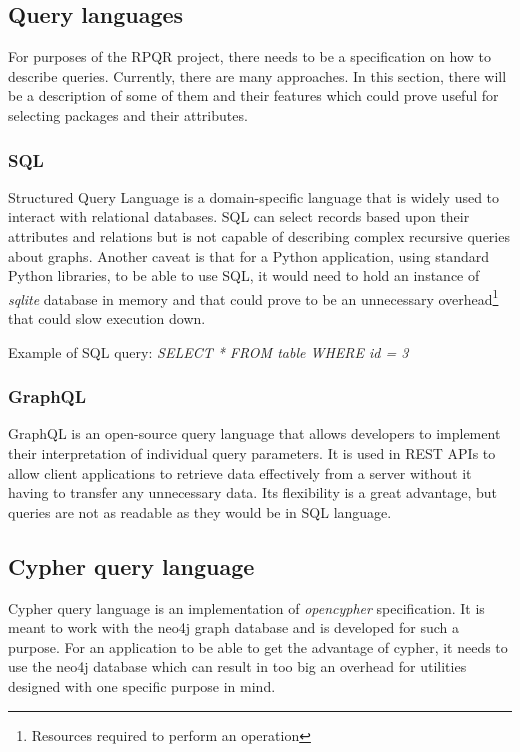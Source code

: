 \subsection*{Query languages}
For purposes of the RPQR project, there needs to be a specification on how to describe queries. Currently,
there are many approaches. In this section, there will be a description of some of them and their features
which could prove useful for selecting packages and their attributes.

\subsubsection*{SQL}
Structured Query Language\cite{SQL} is a domain-specific language that is widely used to interact with
relational databases. SQL can select records based upon their attributes and relations but
is not capable of describing complex recursive queries about graphs. Another caveat is that for a Python
application, using standard Python libraries, to be able to use SQL, it would need to hold an instance of \textit{sqlite} database in memory and
that could prove to be an unnecessary overhead\footnote{Resources required to perform an operation} that could slow execution down.

Example of SQL query:
\textit{SELECT * FROM table WHERE id = 3}

\subsubsection*{GraphQL}
GraphQL\cite{GraphQL} is an open-source query language that allows developers to implement their interpretation
of individual query parameters. It is used in REST APIs to allow client applications to retrieve data
effectively from a server without it having to transfer any unnecessary data. Its flexibility is
a great advantage, but queries are not as readable as they would be in SQL language.

\subsection*{Cypher query language}
Cypher query language is an implementation of \textit{opencypher} specification. It is meant to work with
the neo4j graph database and is developed for such a purpose. For an application to be able to get the advantage
of cypher, it needs to use the neo4j database which can result in too big an overhead for utilities
designed with one specific purpose in mind.

